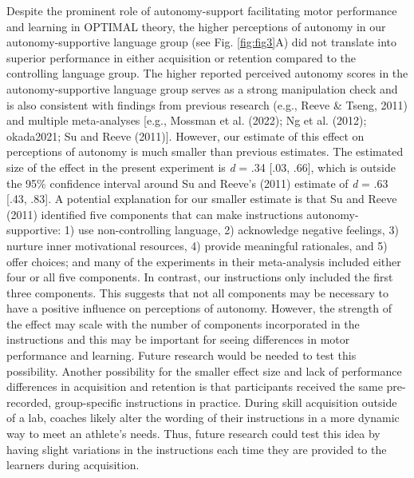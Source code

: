 \documentclass[
  man, donotrepeattitle,mask,floatsintext]{apa7}
\begin{document}
Despite the prominent role of autonomy-support facilitating motor performance and learning in OPTIMAL theory, the higher perceptions of autonomy in our autonomy-supportive language group (see Fig. \ref{fig:fig3}A) did not translate into superior performance in either acquisition or retention compared to the controlling language group. The higher reported perceived autonomy scores in the autonomy-supportive language group serves as a strong manipulation check and is also consistent with findings from previous research (e.g., Reeve \& Tseng, 2011) and multiple meta-analyses {[}e.g., Mossman et al. (2022); Ng et al. (2012); okada2021; Su and Reeve (2011){]}. However, our estimate of this effect on perceptions of autonomy is much smaller than previous estimates. The estimated size of the effect in the present experiment is \emph{d} = .34 {[}.03, .66{]}, which is outside the 95\% confidence interval around Su and Reeve's (2011) estimate of \emph{d} = .63 {[}.43, .83{]}. A potential explanation for our smaller estimate is that Su and Reeve (2011) identified five components that can make instructions autonomy-supportive: 1) use non-controlling language, 2) acknowledge negative feelings, 3) nurture inner motivational resources, 4) provide meaningful rationales, and 5) offer choices; and many of the experiments in their meta-analysis included either four or all five components. In contrast, our instructions only included the first three components. This suggests that not all components may be necessary to have a positive influence on perceptions of autonomy. However, the strength of the effect may scale with the number of components incorporated in the instructions and this may be important for seeing differences in motor performance and learning. Future research would be needed to test this possibility. Another possibility for the smaller effect size and lack of performance differences in acquisition and retention is that participants received the same pre-recorded, group-specific instructions in practice. During skill acquisition outside of a lab, coaches likely alter the wording of their instructions in a more dynamic way to meet an athlete's needs. Thus, future research could test this idea by having slight variations in the instructions each time they are provided to the learners during acquisition.
\end{document}
